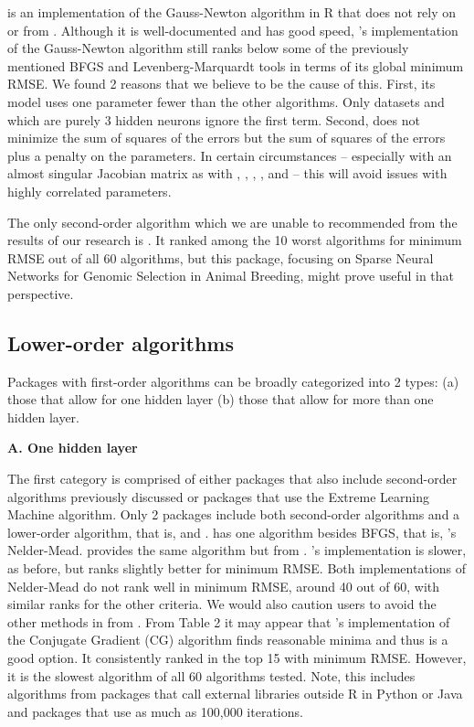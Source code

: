  \citep{R-brnn} is an implementation of the Gauss-Newton
algorithm in R that does not rely on  or  from
. Although it is well-documented and has good speed,
's implementation of the Gauss-Newton algorithm still ranks
below some of the previously mentioned BFGS and Levenberg-Marquardt
tools in terms of its global minimum RMSE. We found 2 reasons that we
believe to be the cause of this. First, its model uses one parameter
fewer than the other algorithms. Only datasets  and
 which are purely 3 hidden neurons ignore the first
term. Second,  does not minimize the sum of squares of the
errors but the sum of squares of the errors plus a penalty on the
parameters. In certain circumstances -- especially with an almost
singular Jacobian matrix as with , ,
, , and  -- this will avoid
issues with highly correlated parameters.

The only second-order algorithm which we are unable to recommended from
the results of our research is  \citep{R-snnR}. It ranked
among the 10 worst algorithms for minimum RMSE out of all 60 algorithms,
but this package, focusing on Sparse Neural Networks for Genomic
Selection in Animal Breeding, might prove useful in that perspective.

\hypertarget{lower-order-algorithms}{%
\subsection{Lower-order algorithms}\label{lower-order-algorithms}}

Packages with first-order algorithms can be broadly categorized into 2
types: (a) those that allow for one hidden layer (b) those that allow
for more than one hidden layer.

\textbf{A. One hidden layer}

The first category is comprised of either packages that also include
second-order algorithms previously discussed or packages that use the
Extreme Learning Machine algorithm. Only 2 packages include both
second-order algorithms and a lower-order algorithm, that is,
 and .  has one algorithm
besides BFGS, that is, 's Nelder-Mead. 
provides the same algorithm but from . 's
implementation is slower, as before, but ranks slightly better for
minimum RMSE. Both implementations of Nelder-Mead do not rank well in
minimum RMSE, around 40 out of 60, with similar ranks for the other
criteria. We would also caution users to avoid the other methods in
 from . From Table 2 it may appear that
's implementation of the Conjugate Gradient (CG) algorithm
finds reasonable minima and thus is a good option. It consistently
ranked in the top 15 with minimum RMSE. However, it is the slowest
algorithm of all 60 algorithms tested. Note, this includes algorithms
from packages that call external libraries outside R in Python or Java
and packages that use as much as 100,000 iterations.

